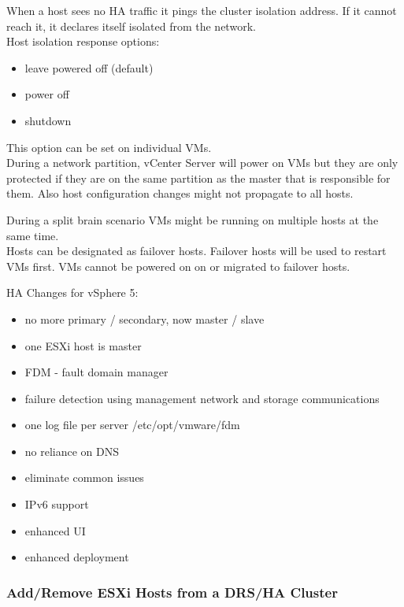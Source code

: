When a host sees no HA traffic it pings the cluster isolation address. If it
cannot reach it, it declares itself isolated from the network.\\

Host isolation response options:

\begin{itemize}
\item leave powered off (default)
\item power off
\item shutdown
\end{itemize}

This option can be set on individual VMs.\\

During a network partition, vCenter Server will power on VMs but they are
only protected if they are on the same partition as the master that is
responsible for them. Also host configuration changes might not propagate to
all hosts.

During a split brain scenario VMs might be running on multiple hosts at the
same time.\\

Hosts can be designated as failover hosts. Failover hosts will be used to
restart VMs first. VMs cannot be powered on on or migrated to failover hosts.

HA Changes for vSphere 5:

\begin{itemize}

\item no more primary / secondary, now master / slave
\item one ESXi host is master
\item FDM - fault domain manager
\item failure detection using management network and storage communications
\item one log file per server /etc/opt/vmware/fdm
\item no reliance on DNS
\item eliminate common issues
\item IPv6 support
\item enhanced UI
\item enhanced deployment

\end{itemize}

\subsubsection{Add/Remove ESXi Hosts from a DRS/HA Cluster}

